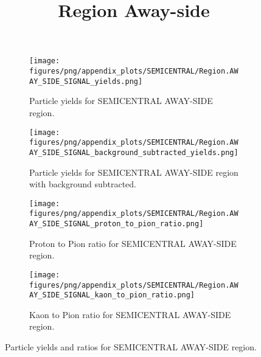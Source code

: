                 \begin{figure}[H]
                    \title{Region Away-side}
                    \begin{subfigure}[b]{0.5\textwidth}
                        \centering
                        \texttt{[image: figures/png/appendix\_plots/SEMICENTRAL/Region.AWAY\_SIDE\_SIGNAL\_yields.png]}
                        \caption{Particle yields for SEMICENTRAL AWAY-SIDE region.}
                        \label{fig:appendix_SEMICENTRAL_AWAY_SIDE_SIGNAL_Inclusive_Yields}
                    \end{subfigure}
                    \begin{subfigure}[b]{0.5\textwidth}
                        \centering
                        \texttt{[image: figures/png/appendix\_plots/SEMICENTRAL/Region.AWAY\_SIDE\_SIGNAL\_background\_subtracted\_yields.png]}
                        \caption{Particle yields for SEMICENTRAL AWAY-SIDE region with background subtracted.}
                        \label{fig:appendix_SEMICENTRAL_AWAY_SIDE_SIGNAL_Inclusive_Yields_Background_Subtracted}
                    \end{subfigure}
                    \begin{subfigure}[b]{0.5\textwidth}
                        \centering
                        \texttt{[image: figures/png/appendix\_plots/SEMICENTRAL/Region.AWAY\_SIDE\_SIGNAL\_proton\_to\_pion\_ratio.png]}
                        \caption{Proton to Pion ratio for SEMICENTRAL AWAY-SIDE region.}
                        \label{fig:appendix_SEMICENTRAL_AWAY_SIDE_SIGNAL_Proton_to_Pion_Ratio}
                    \end{subfigure}
                    \begin{subfigure}[b]{0.5\textwidth}
                        \centering
                        \texttt{[image: figures/png/appendix\_plots/SEMICENTRAL/Region.AWAY\_SIDE\_SIGNAL\_kaon\_to\_pion\_ratio.png]}
                        \caption{Kaon to Pion ratio for SEMICENTRAL AWAY-SIDE region.}
                        \label{fig:appendix_SEMICENTRAL_AWAY_SIDE_SIGNAL_Kaon_to_Pion_Ratio}
                    \end{subfigure}
                    \caption{Particle yields and ratios for SEMICENTRAL AWAY-SIDE region.}
                    \label{fig:appendix_SEMICENTRAL_AWAY_SIDE_SIGNAL_Inclusive_Yields_and_Ratios}
                \end{figure}
